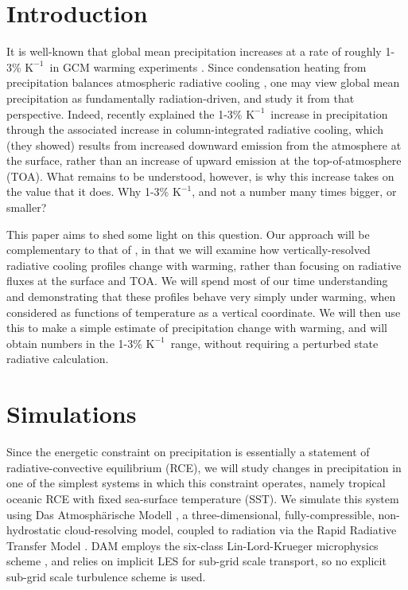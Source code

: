 \documentclass[10pt]{article}
\newcommand{\Kinverse}{\ensuremath{\mathrm{K^{-1}}}}
\begin{document}
\section {Introduction}
It is well-known that global mean precipitation increases at a rate of roughly 1-3\% \Kinverse\  in GCM warming experiments \citep{stephens2008,lambert2008,held2006}. Since condensation heating from precipitation balances atmospheric radiative cooling \citep{ogorman2012,allen2002}, one may view global mean precipitation as  fundamentally radiation-driven, and study it from that perspective. Indeed, \cite{pendergrass2014} recently explained the 1-3\% \Kinverse\ increase in precipitation through the associated increase in column-integrated radiative cooling, which (they showed) results from increased downward emission from the atmosphere at the surface, rather than an increase of upward emission at the top-of-atmosphere (TOA). What remains to be understood, however, is why this increase takes on the value that it does. Why 1-3\% \Kinverse, and not a number many times bigger, or smaller?

This paper aims  to shed some light on this question. Our approach will be complementary to that of \cite{pendergrass2014}, in that we will examine how vertically-resolved radiative cooling profiles change with warming, rather than focusing on radiative fluxes at the surface and TOA. We will spend most of our time understanding and demonstrating that these profiles behave very simply under warming, when considered as functions of temperature as a vertical coordinate. We will then use this  to make a simple estimate 
of precipitation change with warming, and will obtain numbers in the 1-3\% \Kinverse\ range, without requiring a perturbed state radiative calculation.

\section{Simulations}
Since the energetic constraint on precipitation is essentially a statement of radiative-convective equilibrium (RCE), we will study changes in precipitation in one of the simplest systems in which this constraint operates, namely tropical oceanic RCE  with fixed sea-surface temperature (SST). We simulate this system using Das Atmosph\"arische Modell \citep[DAM,][]{romps2008},   a three-dimensional, fully-compressible, non-hydrostatic cloud-resolving model, coupled to radiation via the Rapid Radiative Transfer Model 
\citep[RRTM,][]{mlawer1997}. DAM employs the six-class Lin-Lord-Krueger  microphysics scheme \citep{lin1983, lord1984, krueger1995}, and relies on implicit LES \citep{margolin2006} for sub-grid scale transport, so no explicit sub-grid scale turbulence scheme is used.
	
\end{document}
